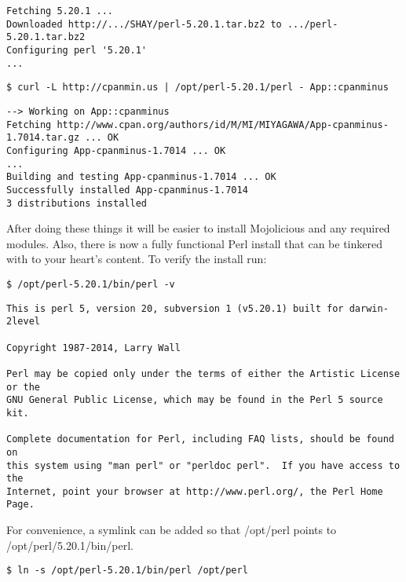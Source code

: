 \documentclass[14pt]{extreport}
\begin{document}
\begin{lstlisting}[style=BashOutputStyle]
Fetching 5.20.1 ...
Downloaded http://.../SHAY/perl-5.20.1.tar.bz2 to .../perl-5.20.1.tar.bz2
Configuring perl '5.20.1'
...
\end{lstlisting}

\begin{lstlisting}[style=BashInputStyle, keepspaces=true]
$ curl -L http://cpanmin.us | /opt/perl-5.20.1/perl - App::cpanminus
\end{lstlisting}

\begin{lstlisting}[style=BashOutputStyle]
--> Working on App::cpanminus
Fetching http://www.cpan.org/authors/id/M/MI/MIYAGAWA/App-cpanminus-1.7014.tar.gz ... OK
Configuring App-cpanminus-1.7014 ... OK
...
Building and testing App-cpanminus-1.7014 ... OK
Successfully installed App-cpanminus-1.7014
3 distributions installed
\end{lstlisting}

\clearpage

After doing these things it will be easier to install Mojolicious and any
required modules.  Also, there is now a fully functional Perl install that can
be tinkered with to your heart's content.  To verify the install run:

\begin{lstlisting}[style=BashInputStyle]
$ /opt/perl-5.20.1/bin/perl -v
\end{lstlisting}

\begin{lstlisting}[style=BashOutputStyle]
This is perl 5, version 20, subversion 1 (v5.20.1) built for darwin-2level

Copyright 1987-2014, Larry Wall

Perl may be copied only under the terms of either the Artistic License or the
GNU General Public License, which may be found in the Perl 5 source kit.

Complete documentation for Perl, including FAQ lists, should be found on
this system using "man perl" or "perldoc perl".  If you have access to the
Internet, point your browser at http://www.perl.org/, the Perl Home Page.
\end{lstlisting}

For convenience, a symlink can be added so that /opt/perl points to
/opt/perl/5.20.1/bin/perl.

\begin{lstlisting}[style=BashInputStyle]
$ ln -s /opt/perl-5.20.1/bin/perl /opt/perl
\end{lstlisting}
\end{document}

